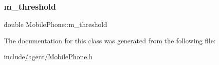 \mbox{\label{class_mobile_phone_afb6364675f7cf6e09856f49ae6c10563}} 
\subsubsection{\texorpdfstring{m\+\_\+threshold}{m\_threshold}}
{\footnotesize\ttfamily double Mobile\+Phone\+::m\+\_\+threshold\hspace{0.3cm}{\ttfamily [private]}}



The documentation for this class was generated from the following file\+:\begin{DoxyCompactItemize}
\item 
include/agent/\hyperlink{_mobile_phone_8h}{Mobile\+Phone.\+h}\end{DoxyCompactItemize}
